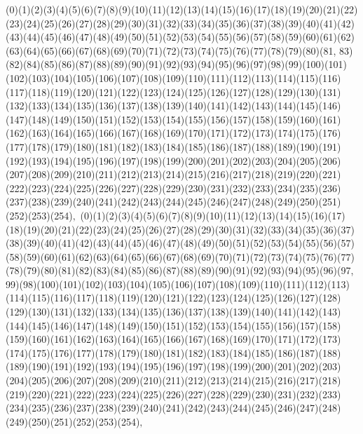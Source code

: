 \documentclass[12pt]{article}
\begin{document}
{(0)(1)(2)(3)(4)(5)(6)(7)(8)(9)(10)(11)(12)(13)(14)(15)(16)(17)(18)(19)(20)(21)(22)(23)(24)(25)(26)(27)(28)(29)(30)(31)(32)(33)(34)(35)(36)(37)(38)(39)(40)(41)(42)(43)(44)(45)(46)(47)(48)(49)(50)(51)(52)(53)(54)(55)(56)(57)(58)(59)(60)(61)(62)(63)(64)(65)(66)(67)(68)(69)(70)(71)(72)(73)(74)(75)(76)(77)(78)(79)(80)(81, 83)(82)(84)(85)(86)(87)(88)(89)(90)(91)(92)(93)(94)(95)(96)(97)(98)(99)(100)(101)(102)(103)(104)(105)(106)(107)(108)(109)(110)(111)(112)(113)(114)(115)(116)(117)(118)(119)(120)(121)(122)(123)(124)(125)(126)(127)(128)(129)(130)(131)(132)(133)(134)(135)(136)(137)(138)(139)(140)(141)(142)(143)(144)(145)(146)(147)(148)(149)(150)(151)(152)(153)(154)(155)(156)(157)(158)(159)(160)(161)(162)(163)(164)(165)(166)(167)(168)(169)(170)(171)(172)(173)(174)(175)(176)(177)(178)(179)(180)(181)(182)(183)(184)(185)(186)(187)(188)(189)(190)(191)(192)(193)(194)(195)(196)(197)(198)(199)(200)(201)(202)(203)(204)(205)(206)(207)(208)(209)(210)(211)(212)(213)(214)(215)(216)(217)(218)(219)(220)(221)(222)(223)(224)(225)(226)(227)(228)(229)(230)(231)(232)(233)(234)(235)(236)(237)(238)(239)(240)(241)(242)(243)(244)(245)(246)(247)(248)(249)(250)(251)(252)(253)(254)$
, 
$
(0)(1)(2)(3)(4)(5)(6)(7)(8)(9)(10)(11)(12)(13)(14)(15)(16)(17)(18)(19)(20)(21)(22)(23)(24)(25)(26)(27)(28)(29)(30)(31)(32)(33)(34)(35)(36)(37)(38)(39)(40)(41)(42)(43)(44)(45)(46)(47)(48)(49)(50)(51)(52)(53)(54)(55)(56)(57)(58)(59)(60)(61)(62)(63)(64)(65)(66)(67)(68)(69)(70)(71)(72)(73)(74)(75)(76)(77)(78)(79)(80)(81)(82)(83)(84)(85)(86)(87)(88)(89)(90)(91)(92)(93)(94)(95)(96)(97, 99)(98)(100)(101)(102)(103)(104)(105)(106)(107)(108)(109)(110)(111)(112)(113)(114)(115)(116)(117)(118)(119)(120)(121)(122)(123)(124)(125)(126)(127)(128)(129)(130)(131)(132)(133)(134)(135)(136)(137)(138)(139)(140)(141)(142)(143)(144)(145)(146)(147)(148)(149)(150)(151)(152)(153)(154)(155)(156)(157)(158)(159)(160)(161)(162)(163)(164)(165)(166)(167)(168)(169)(170)(171)(172)(173)(174)(175)(176)(177)(178)(179)(180)(181)(182)(183)(184)(185)(186)(187)(188)(189)(190)(191)(192)(193)(194)(195)(196)(197)(198)(199)(200)(201)(202)(203)(204)(205)(206)(207)(208)(209)(210)(211)(212)(213)(214)(215)(216)(217)(218)(219)(220)(221)(222)(223)(224)(225)(226)(227)(228)(229)(230)(231)(232)(233)(234)(235)(236)(237)(238)(239)(240)(241)(242)(243)(244)(245)(246)(247)(248)(249)(250)(251)(252)(253)(254)$
, 
$
}
\end{document}
